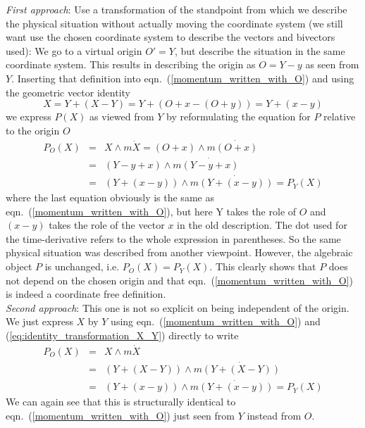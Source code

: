 \emph{First approach}: Use a transformation of the standpoint from which we describe the
physical situation without actually moving the coordinate system (we still want use the
chosen coordinate system to describe the vectors and bivectors used): We go to a virtual
origin $O' = Y$, but describe the situation in the same coordinate system. This results in
describing the origin as $O = Y - y$ as seen from $Y$. Inserting that definition into
eqn.~(\ref{momentum_written_with_O}) and using the geometric vector identity
\begin{equation}
X = Y + (X-Y) = Y + (O+x-(O+y)) = Y + (x-y)
\label{eq:identity_transformation_X_Y}
\end{equation}
we express $P(X)$ as viewed from $Y$ by reformulating the equation for $P$ relative to the
origin $O$
\begin{eqnarray}
    P_O(X) &=& X \wedge m \dot{X} = (O + x) \wedge m \dot{(O + x)} \nonumber \\
           &=& (Y - y + x) \wedge m \dot{(Y - y + x)} \nonumber \\
           &=& (Y + (x-y)) \wedge m \dot{(Y + (x - y))} = P_Y(X)
\end{eqnarray}
where the last equation obviously is the same as eqn.~(\ref{momentum_written_with_O}), but
here Y takes the role of $O$ and $(x-y)$ takes the role of the vector $x$ in the old
description. The dot used for the time-derivative refers to the whole expression in
parentheses. So the same physical situation was described from another viewpoint. However,
the algebraic object $P$ is unchanged, i.e. $P_O(X) = P_Y(X)$. This clearly shows that $P$
does not depend on the chosen origin and that eqn.~(\ref{momentum_written_with_O}) is
indeed a coordinate free definition. \\

\emph{Second approach}: This one is not so explicit on being independent of the origin. We
just express $X$ by $Y$ using eqn.~(\ref{momentum_written_with_O}) and
(\ref{eq:identity_transformation_X_Y}) directly to write
\begin{eqnarray}
    P_O(X) &=& X \wedge m \dot{X} \nonumber \\
           &=& (Y + (X-Y)) \wedge m \dot{(Y + (X-Y))} \nonumber \\
           &=& (Y + (x-y)) \wedge m \dot{(Y + (x - y))} = P_Y(X)
\end{eqnarray}
We can again see that this is structurally identical to
eqn.~(\ref{momentum_written_with_O}) just seen from $Y$ instead from $O$. \\

